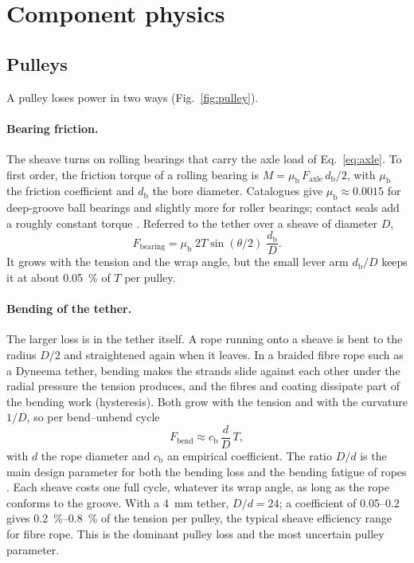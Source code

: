 \documentclass[11pt,a4paper]{article}
\begin{document}
\section{Component physics}

\subsection{Pulleys}
\label{sec:pulleys}
A pulley loses power in two ways (Fig.~\ref{fig:pulley}).

\paragraph{Bearing friction.} The sheave turns on rolling bearings that carry
the axle load of Eq.~\eqref{eq:axle}. To first order, the friction torque of a
rolling bearing is $M = \mu_\mathrm{b}\,F_\mathrm{axle}\,d_\mathrm{b}/2$, with
$\mu_\mathrm{b}$ the friction coefficient and $d_\mathrm{b}$ the bore diameter.
Catalogues give $\mu_\mathrm{b} \approx 0.0015$ for deep-groove ball bearings
and slightly more for roller bearings; contact seals add a roughly constant
torque \cite{skf}. Referred to the tether over a sheave of diameter $D$,
\begin{equation}
  F_\mathrm{bearing} = \mu_\mathrm{b}\; 2T\sin(\theta/2)\;\frac{d_\mathrm{b}}{D} .
\end{equation}
It grows with the tension and the wrap angle, but the small lever arm
$d_\mathrm{b}/D$ keeps it at about \SI{0.05}{\percent} of $T$ per pulley.

\paragraph{Bending of the tether.} The larger loss is in the tether itself. A
rope running onto a sheave is bent to the radius $D/2$ and straightened again
when it leaves. In a braided fibre rope such as a Dyneema tether, bending makes
the strands slide against each other under the radial pressure the tension
produces, and the fibres and coating dissipate part of the bending work
(hysteresis). Both grow with the tension and with the curvature $1/D$, so per
bend--unbend cycle
\begin{equation}
  F_\mathrm{bend} \approx c_\mathrm{b}\,\frac{d}{D}\,T ,
\end{equation}
with $d$ the rope diameter and $c_\mathrm{b}$ an empirical coefficient. The
ratio $D/d$ is the main design parameter for both the bending loss and the
bending fatigue of ropes \cite{feyrer}. Each sheave costs one full cycle,
whatever its wrap angle, as long as the rope conforms to the groove. With a
\SI{4}{mm} tether, $D/d = 24$; a coefficient of 0.05--0.2 gives
\SIrange{0.2}{0.8}{\percent} of the tension per pulley, the typical sheave
efficiency range for fibre rope. This is the dominant pulley loss and the most
uncertain pulley parameter.
\end{document}
